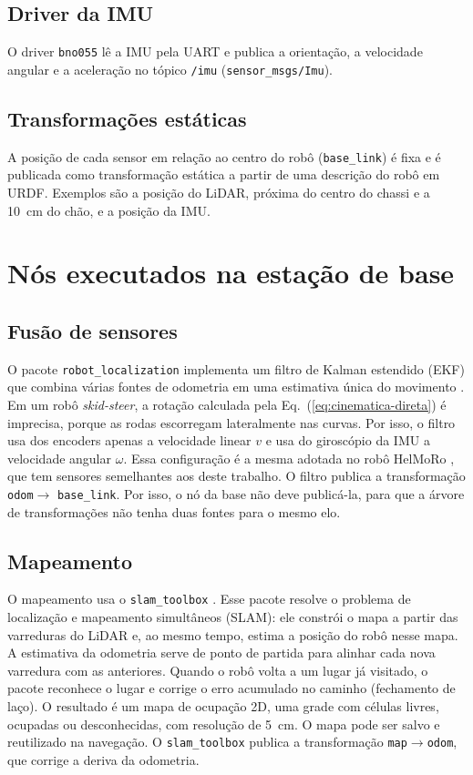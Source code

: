 \subsection{Driver da IMU}

O driver \texttt{bno055} \cite{bno055ros} lê a IMU pela UART e publica a
orientação, a velocidade angular e a aceleração no tópico \texttt{/imu}
(\texttt{sensor\_msgs/Imu}).

\subsection{Transformações estáticas}

A posição de cada sensor em relação ao centro do robô
(\texttt{base\_link}) é fixa e é publicada como transformação estática a
partir de uma descrição do robô em URDF. Exemplos são a posição do LiDAR,
próxima do centro do chassi e a 10~cm do chão, e a posição da IMU.

\section{Nós executados na estação de base}

\subsection{Fusão de sensores}

O pacote \texttt{robot\_localization} implementa um filtro de Kalman
estendido (EKF) que combina várias fontes de odometria em uma estimativa
única do movimento \cite{moore2016ekf}. Em um robô \textit{skid-steer}, a
rotação calculada pela Eq.~(\ref{eq:cinematica-direta}) é imprecisa,
porque as rodas escorregam lateralmente nas curvas. Por isso, o filtro
usa dos encoders apenas a velocidade linear $v$ e usa do giroscópio da IMU
a velocidade angular $\omega$. Essa configuração é a mesma adotada no
robô HelMoRo \cite{helmoro}, que tem sensores semelhantes aos deste
trabalho. O filtro publica a transformação \texttt{odom}$\rightarrow$%
\texttt{base\_link}. Por isso, o nó da base não deve publicá-la, para que
a árvore de transformações não tenha duas fontes para o mesmo elo.

\subsection{Mapeamento}

O mapeamento usa o \texttt{slam\_toolbox} \cite{macenski2021slam}. Esse
pacote resolve o problema de localização e mapeamento simultâneos (SLAM):
ele constrói o mapa a partir das varreduras do LiDAR e, ao mesmo tempo,
estima a posição do robô nesse mapa. A estimativa da odometria serve de
ponto de partida para alinhar cada nova varredura com as anteriores.
Quando o robô volta a um lugar já visitado, o pacote reconhece o lugar e
corrige o erro acumulado no caminho (fechamento de laço). O resultado é
um mapa de ocupação 2D, uma grade com células livres, ocupadas ou
desconhecidas, com resolução de 5~cm. O mapa pode ser salvo e reutilizado
na navegação. O \texttt{slam\_toolbox} publica a transformação
\texttt{map}$\rightarrow$\texttt{odom}, que corrige a deriva da
odometria.


